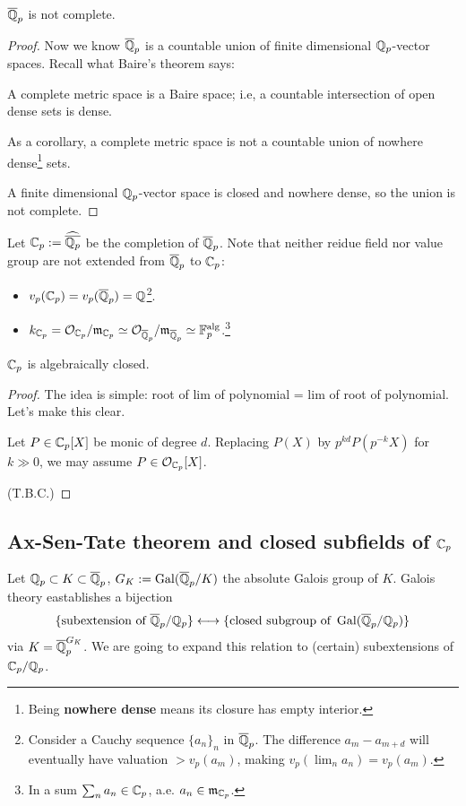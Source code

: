 \begin{corollary}
    $\overline{\mathbb{Q}}_p$ is not complete.
\end{corollary}
\begin{proof}
    Now we know $\overline{\mathbb{Q}}_p$ is a countable union of finite dimensional $\mathbb{Q}_p$-vector spaces.
    Recall what Baire's theorem says:
    \begin{theorem}
        \label{Baire thm}
        A complete metric space is a Baire space;
        i.e, a countable intersection of open dense sets is dense.

        As a corollary, a complete metric space is not a countable union of nowhere dense\footnote{Being \textbf{nowhere dense} means its closure has empty interior.} sets.
    \end{theorem}
    A finite dimensional $\mathbb{Q}_p$-vector space is closed and nowhere dense, so the union is not complete.
\end{proof}

Let $\mathbb{C}_p := \widehat{\overline{\mathbb{Q}_p}}$ be the completion of $\overline{\mathbb{Q}}_p$.
Note that neither reidue field nor value group are not extended from $\overline{\mathbb{Q}}_p$ to $\mathbb{C}_p$:
\begin{itemize}
    \item $v_p(\mathbb{C}_p) = v_p(\overline{\mathbb{Q}}_p) = \mathbb{Q}$\footnote{
        Consider a Cauchy sequence $\{a_n\}_n$ in $\overline{\mathbb{Q}}_p$.
        The difference $a_m-a_{m + d}$ will eventually have valuation $>v_p(a_m)$,
        making $v_p(\lim_{n}a_n) = v_p(a_m)$.
    }.
    \item $k_{\mathbb{C}_p} = \mathcal{O}_{\mathbb{C}_p}/\mathfrak{m}_{\mathbb{C}_p}\simeq\mathcal{O}_{\overline{\mathbb{Q}}_p}/\mathfrak{m}_{\overline{\mathbb{Q}}_p}\simeq\mathbb{F}_p^{\mathrm{alg}}$.\footnote{
        In a sum $\sum_n a_n\in\mathbb{C}_p$,
        a.e. $a_n\in\mathfrak{m}_{\mathbb{C}_p}$. 
    }
\end{itemize}

\begin{theorem}
    $\mathbb{C}_p$ is algebraically closed.
\end{theorem}
\begin{proof}
    The idea is simple: root of lim of polynomial = lim of root of polynomial. Let's make this clear.

    Let $P\in \mathbb{C}_p[X]$ be monic of degree $d$.
    Replacing $P(X)$ by $p^{kd}P(p^{-k} X)$ for $k\gg 0$, we may assume $P\in\mathcal{O}_{\mathbb{C}_p}[X]$.

    (T.B.C.)
\end{proof}

\subsection{Ax-Sen-Tate theorem and closed subfields of \texorpdfstring{$\mathbb{C}_p$}{Cp}}
Let $\mathbb{Q}_p\subset K\subset\overline{\mathbb{Q}}_p$, $G_K := \operatorname{Gal}(\overline{\mathbb{Q}}_p/K)$ the absolute Galois group of $K$.
Galois theory eastablishes a bijection \[
    \{\text{subextension of }\overline{\mathbb{Q}}_p/\mathbb{Q}_p\}\longleftrightarrow
    \{\text{closed subgroup of }\operatorname{Gal}(\overline{\mathbb{Q}}_p/\mathbb{Q}_p)\}
\] via $K = \overline{\mathbb{Q}}_p^{G_K}$.
We are going to expand this relation to (certain) subextensions of $\mathbb{C}_p/\mathbb{Q}_p$.

